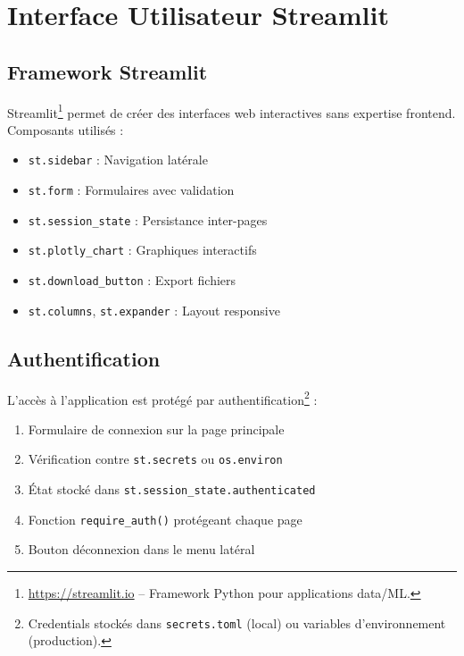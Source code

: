 \documentclass[12pt,a4paper,twoside]{article}
\begin{document}
\section{Interface Utilisateur Streamlit}

\subsection{Framework Streamlit}

Streamlit\footnote{\url{https://streamlit.io} -- Framework Python pour applications data/ML.} permet de créer des interfaces web interactives sans expertise frontend. Composants utilisés :

\begin{itemize}[noitemsep]
    \item \texttt{st.sidebar} : Navigation latérale
    \item \texttt{st.form} : Formulaires avec validation
    \item \texttt{st.session\_state} : Persistance inter-pages
    \item \texttt{st.plotly\_chart} : Graphiques interactifs
    \item \texttt{st.download\_button} : Export fichiers
    \item \texttt{st.columns}, \texttt{st.expander} : Layout responsive
\end{itemize}

\subsection{Authentification}

L'accès à l'application est protégé par authentification\footnote{Credentials stockés dans \texttt{secrets.toml} (local) ou variables d'environnement (production).} :

\begin{enumerate}[noitemsep]
    \item Formulaire de connexion sur la page principale
    \item Vérification contre \texttt{st.secrets} ou \texttt{os.environ}
    \item État stocké dans \texttt{st.session\_state.authenticated}
    \item Fonction \texttt{require\_auth()} protégeant chaque page
    \item Bouton déconnexion dans le menu latéral
\end{enumerate}
\end{document}
